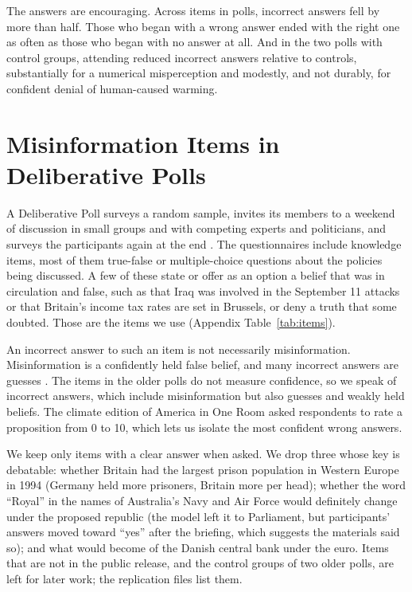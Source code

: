 \documentclass[11pt]{article}
\begin{document}
The answers are encouraging. Across \nItems{} items in \nPolls{} polls, incorrect answers fell by more than half. Those who began with a wrong answer ended with the right one as often as those who began with no answer at all. And in the two polls with control groups, attending reduced incorrect answers relative to controls, substantially for a numerical misperception and modestly, and not durably, for confident denial of human-caused warming.

\section{Misinformation Items in Deliberative Polls}

A Deliberative Poll surveys a random sample, invites its members to a weekend of discussion in small groups and with competing experts and politicians, and surveys the participants again at the end \citep{luskin2002}. The questionnaires include knowledge items, most of them true-false or multiple-choice questions about the policies being discussed. A few of these state or offer as an option a belief that was in circulation and false, such as that Iraq was involved in the September 11 attacks or that Britain's income tax rates are set in Brussels, or deny a truth that some doubted. Those are the items we use (Appendix Table~\ref{tab:items}).

An incorrect answer to such an item is not necessarily misinformation. Misinformation is a confidently held false belief, and many incorrect answers are guesses \citep{luskin2026, luskin2011, cor2016}. The items in the older polls do not measure confidence, so we speak of incorrect answers, which include misinformation but also guesses and weakly held beliefs. The climate edition of America in One Room asked respondents to rate a proposition from 0 to 10, which lets us isolate the most confident wrong answers.

We keep only items with a clear answer when asked. We drop three whose key is debatable: whether Britain had the largest prison population in Western Europe in 1994 (Germany held more prisoners, Britain more per head); whether the word ``Royal'' in the names of Australia's Navy and Air Force would definitely change under the proposed republic (the model left it to Parliament, but participants' answers moved toward ``yes'' after the briefing, which suggests the materials said so); and what would become of the Danish central bank under the euro. Items that are not in the public release, and the control groups of two older polls, are left for later work; the replication files list them.
\end{document}
